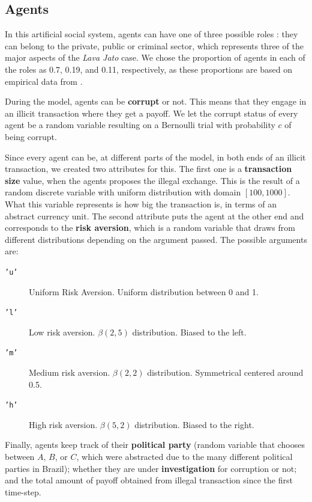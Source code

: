 \documentclass[letterpaper, 11pt]{article}
\begin{document}
\subsection{Agents}
\label{sec:org03bb9d1}
In this artificial social system, agents can have one of three possible roles \citep{parsons1991}: they can belong to the private, public or criminal sector, which represents three of the major aspects of the \emph{Lava Jato} case. We chose the proportion of agents in each of the roles as 0.7, 0.19, and 0.11, respectively, as these proportions are based on empirical data from \citet{garay18}.

During the model, agents can be \textbf{corrupt} or not. This means that they engage in an illicit transaction where they get a payoff. We let the corrupt status of every agent be a random variable resulting on a Bernoulli trial with probability \(c\) of being corrupt.

Since every agent can be, at different parts of the model, in both ends of an illicit transaction, we created two attributes for this. The first one is a \textbf{transaction size} value, when the agents proposes the illegal exchange. This is the result of a random discrete variable with uniform distribution with domain \([100, 1000]\). What this variable represents is how big the transaction is, in terms of an abstract currency unit. The second attribute puts the agent at the other end and corresponds to the \textbf{risk aversion}, which is a random variable that draws from different distributions depending on the argument passed. The possible arguments are:

\begin{description}
\item[{\texttt{'u'}}] Uniform Risk Aversion. Uniform distribution between 0 and 1.
\item[{\texttt{'l'}}] Low risk aversion. \(\beta(2, 5)\) distribution. Biased to the left.
\item[{\texttt{'m'}}] Medium risk aversion. \(\beta(2, 2)\) distribution. Symmetrical centered around 0.5.
\item[{\texttt{'h'}}] High risk aversion. \(\beta(5, 2)\) distribution. Biased to the right.
\end{description}

Finally, agents keep track of their \textbf{political party} (random variable that chooses
between \(A\), \(B\), or \(C\), which were abstracted due to the many different political parties in Brazil); whether they are under \textbf{investigation} for corruption or not; and the total amount of payoff obtained from illegal transaction since the first time-step.
\end{document}
